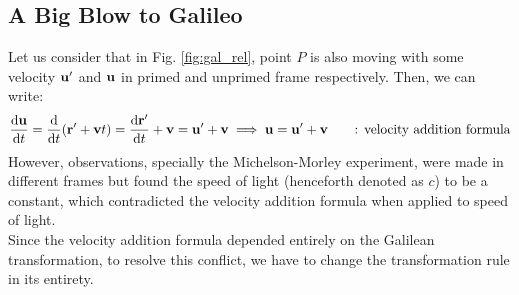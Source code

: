 \subsection*{A Big Blow to Galileo }
Let us consider that in Fig. \ref{fig:gal_rel}, point $P$ is also moving with some velocity $\vb{u}'$ and $\vb{u}$ in primed and unprimed frame respectively. Then, we can write:
$$\dv{\vb{u}}{t} = \dv{t} (\vb{r}' + \vb{v}t) = \dv{\vb{r}'}{t} + \vb{v} = \vb{u}'+\vb{v}\implies \vb{u} = \vb{u}'+\vb{v} \qquad \text{: velocity addition formula}$$
However, observations, specially the Michelson-Morley experiment, were made in different frames but found the speed of light (henceforth denoted as $c$) to be a constant, which contradicted the velocity addition formula when applied to speed of light. \\[0.2cm]
Since the velocity addition formula depended entirely on the Galilean transformation, to resolve this conflict, we have to change the transformation rule in its entirety.